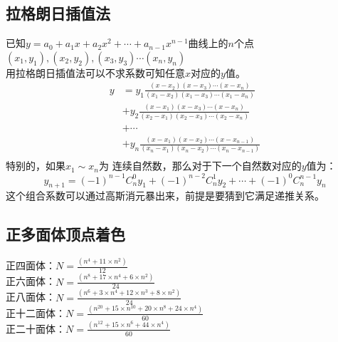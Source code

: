 	\subsection{拉格朗日插值法}
	已知$y=a_0+a_1x+a_2x^2+\cdots +a_{n-1}x^{n-1}$曲线上的$n$个点$(x_1,y_1),(x_2,y_2),(x_3,y_3)\cdots (x_n,y_n)$\\
	用拉格朗日插值法可以不求系数可知任意$x$对应的$y$值。\\
	\[ \begin{split}
	y &= y_1\frac{(x-x_2)(x-x_3)\cdots (x-x_n)}{(x_1-x_2)(x_1-x_3)\cdots (x_1-x_n)}\\
	&+ y_2\frac{(x-x_1)(x-x_3)\cdots (x-x_n)}{(x_2-x_1)(x_2-x_3)\cdots (x_2-x_n)}\\
	&+ \cdots \\
	&+ y_n\frac{(x-x_1)(x-x_2)\cdots (x-x_{n-1})}{(x_n-x_1)(x_n-x_2)\cdots (x_n-x_{n-1})}\\
	\end{split}\]
	特别的，如果$x_1\sim x_n$为 连续自然数，那么对于下一个自然数对应的$y$值为：\\
	\[y_{n+1}=(-1)^{n-1}C_n^0y_1+(-1)^{n-2}C_n^1y_2+\cdots +(-1)^0C_n^{n-1}y_n\]
	这个组合系数可以通过高斯消元暴出来，前提是要猜到它满足递推关系。\\
	
	\subsection{正多面体顶点着色}
	正四面体：$N = \frac{(n^{4}+11\times n^{2})}{12}$\\
	正六面体：$N = \frac{(n^{8}+17\times n^{4}+6\times n^{2})}{24}$\\
	正八面体：$N = \frac{(n^{6}+3\times n^{4}+12\times n^{3}+8\times n^{2})}{24}$\\
	正十二面体：$N = \frac{(n^{20}+15\times n^{10}+20\times n^{8}+24\times n^{4})}{60}$\\
	正二十面体：$N = \frac{(n^{12}+15\times n^{6}+44\times n^{4})}{60}$\\
	
